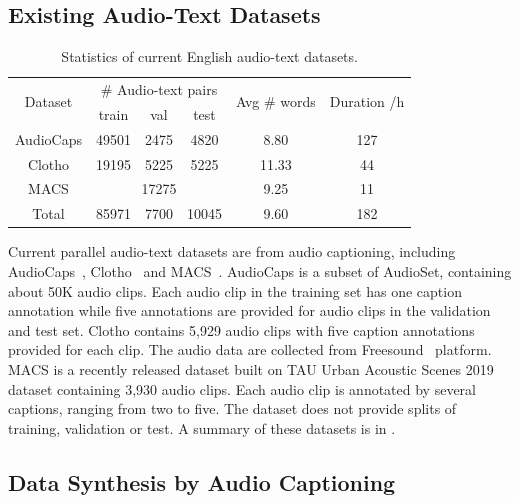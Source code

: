 \documentclass[sigconf,anonymous,review]{acmart}
\begin{document}
\subsection{Existing Audio-Text Datasets}
\label{subsec:real_datasets}

\begin{table}[ht]
    \centering
    \begin{tabular}{c||ccc|c|c}
    \toprule
    \multirow{2}{*}{Dataset} & \multicolumn{3}{c|}{\# Audio-text pairs} & \multirow{2}{*}{Avg \# words} & \multirow{2}{*}{Duration /h} \\
    \cline{2-4}
     & train & val & test & & \\
    \midrule
    AudioCaps & 49501 & 2475 & 4820 & 8.80 & 127\\
    \hline
    Clotho & 19195 & 5225 & 5225 & 11.33 & 44\\
    \hline
    MACS & \multicolumn{3}{c|}{17275} & 9.25 & 11\\
    \midrule
    Total & 85971 & 7700 & 10045 & 9.60 & 182\\
    \bottomrule
    \end{tabular}
    \caption{Statistics of current English audio-text datasets.}
    \label{tab:real_datasets}
\end{table}

Current parallel audio-text datasets are from audio captioning, including AudioCaps~\cite{kim2019audiocaps}, Clotho~\cite{drossos2020clotho} and MACS~\cite{martin2021diversity}.
AudioCaps is a subset of AudioSet, containing about 50K audio clips.
Each audio clip in the training set has one caption annotation while five annotations are provided for audio clips in the validation and test set.
Clotho contains 5,929 audio clips with five caption annotations provided for each clip.
The audio data are collected from Freesound~\cite{font2013freesound} platform.
MACS is a recently released dataset built on TAU Urban Acoustic Scenes 2019 dataset containing 3,930 audio clips.
Each audio clip is annotated by several captions, ranging from two to five.
The dataset does not provide splits of training, validation or test.
A summary of these datasets is in .



\subsection{Data Synthesis by Audio Captioning}
\label{subsec:syn_data_generation}
\end{document}
